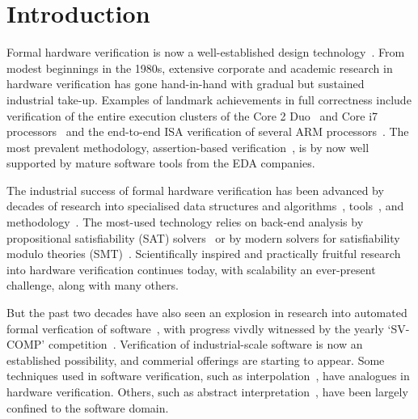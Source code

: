 \section{Introduction}\label{sec:intro}
%
Formal hardware verification is now a well-established design technology~\cite{Seligman:2015:FV}. From modest beginnings in the 1980s, extensive corporate and academic research in hardware verification has gone hand-in-hand with gradual but sustained industrial take-up. Examples of landmark achievements in full correctness include verification of the entire execution clusters of the Core 2 Duo~\cite{Core2}  and Core i7 processors~\cite{i7} and the end-to-end ISA verification of several ARM processors~\cite{ARM}. The most prevalent methodology, assertion-based verification~\cite{Foster:2009:AAB}, is by now well supported by mature software tools from the EDA companies.

The industrial success of formal hardware verification has been advanced by decades of research into specialised data structures and algorithms~\cite{ic3,fmcad2000,ken,biere,STE}, tools~\cite{Seger:2005:IEE,abc,ebmc,vis,cadence,synopsysfv}, and methodology~\cite{MCMILLAN2000279,Aagaard:2000:MLH,uclid,word-term,word-bmc,DBLP:conf/lpar/AndrausLS08}.  The most-used technology relies on back-end analysis by propositional satisfiability (SAT) solvers~\cite{Biere1999} or by modern solvers for satisfiability modulo theories (SMT)~\cite{decision_procedures, DBLP:conf/lpar/AndrausLS08,soc-keating,
DBLP:conf/mtv/SunkariCVM07,DBLP:conf/cav/Bjesse08}. Scientifically inspired and practically fruitful research into hardware verification continues today, with scalability an ever-present challenge, along with many others. 

But the past two decades have also seen an explosion in research into automated formal verfication of software~\cite{dkw2008}, with progress vivdly witnessed by the yearly `SV-COMP' competition~\cite{Beyer2017}.  Verification of industrial-scale software is now an established possibility, and commerial offerings are starting to appear. Some techniques used in software verification, such as interpolation~\cite{Interpolants,Kroening:2011:ISV}, have analogues in hardware verification. Others, such as abstract interpretation~\cite{CousotCousot77,Cousot:1996:AI}, have been largely confined to the software domain.  

